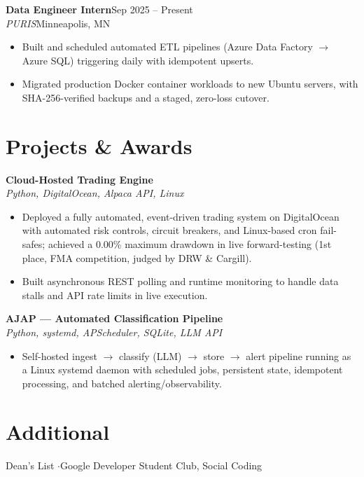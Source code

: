 \documentclass[letterpaper,10.5pt]{article}
\newcommand{\entry}[4]{\textbf{#1}\hfill{\small #2}\\\textit{\small #3}\hfill{\small #4}\par\vspace{1pt}}
\begin{document}
\entry{Data Engineer Intern}{Sep 2025 -- Present}{PURIS}{Minneapolis, MN}
\begin{itemize}
  \item Built and scheduled automated ETL pipelines (Azure Data Factory $\rightarrow$ Azure SQL) triggering daily with idempotent upserts.
  \item Migrated production Docker container workloads to new Ubuntu servers, with SHA-256-verified backups and a staged, zero-loss cutover.
\end{itemize}

\section{Projects \& Awards}
\entry{Cloud-Hosted Trading Engine}{}{Python, DigitalOcean, Alpaca API, Linux}{}
\begin{itemize}
  \item Deployed a fully automated, event-driven trading system on DigitalOcean with automated risk controls, circuit breakers, and Linux-based cron fail-safes; achieved a 0.00\% maximum drawdown in live forward-testing (1st place, FMA competition, judged by DRW \& Cargill).
  \item Built asynchronous REST polling and runtime monitoring to handle data stalls and API rate limits in live execution.
\end{itemize}

\entry{AJAP --- Automated Classification Pipeline}{}{Python, systemd, APScheduler, SQLite, LLM API}{}
\begin{itemize}
  \item Self-hosted ingest $\rightarrow$ classify (LLM) $\rightarrow$ store $\rightarrow$ alert pipeline running as a Linux systemd daemon with scheduled jobs, persistent state, idempotent processing, and batched alerting/observability.
\end{itemize}

\section{Additional}
{\small Dean's List \quad$\cdot$\quad Google Developer Student Club, Social Coding}
\end{document}
